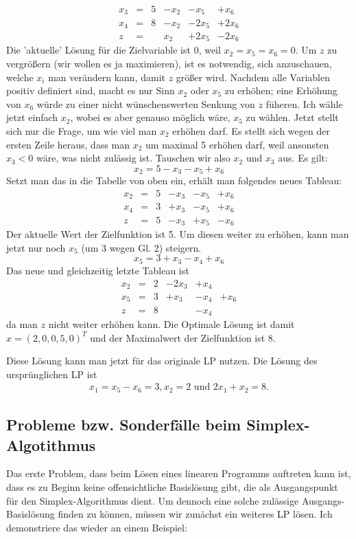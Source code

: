 \documentclass{article}
\begin{document}
\[
\begin{matrix}
    x_3&=&5&-x_2&-x_5&+x_6\\
    x_4&=&8&-x_2&-2x_5&+2x_6\\
    \hline
    z&=&&x_2&+2x_5&-2x_6
\end{matrix}
\]Die 'aktuelle' Lösung für die Zielvariable ist 0, weil \(x_2=x_5=x_6=0\). Um \(z\) zu vergrößern (wir wollen es ja maximieren), ist es notwendig, sich anzuschauen, welche \(x_i\) man verändern kann, damit \(z\) größer wird. Nachdem alle Variablen positiv definiert sind, macht es nur Sinn \(x_2\) oder \(x_5\) zu erhöhen; eine Erhöhung von \(x_6\) würde zu einer nicht wünschenswerten Senkung von \(z\) füheren. Ich wähle jetzt einfach \(x_2\), wobei es aber genauso möglich wäre, \(x_5\) zu wählen. Jetzt stellt sich nur die Frage, um wie viel man \(x_2\) erhöhen darf. Es stellt sich wegen der ersten Zeile heraus, dass man \(x_2\) um maximal 5 erhöhen darf, weil ansonsten \(x_3<0\) wäre, was nicht zulässig ist. Tauschen wir also \(x_2\) und \(x_3\) aus. Es gilt:
\[
x_2 = 5-x_3-x_5+x_6
\]
Setzt man das in die Tabelle von oben ein, erhält man folgendes neues Tableau:
\[
\begin{matrix}
    x_2&=&5&-x_3&-x_5&+x_6\\
    x_4&=&3&+x_3&-x_5&+x_6\\
    \hline
    z&=&5&-x_3&+x_5&-x_6
\end{matrix}
\]Der aktuelle Wert der Zielfunktion ist 5. Um diesen weiter zu erhöhen, kann man jetzt nur noch \(x_5\) (um 3 wegen Gl. 2) steigern.
\[
x_5=3+x_3-x_4+x_6
\]Das neue und gleichzeitig letzte Tableau ist\[
\begin{matrix}
    x_2&=&2&-2x_3&+x_4&\\
    x_5&=&3&+x_3&-x_4&+x_6\\
    \hline
    z&=&8&&-x_4&
\end{matrix}
\]da man \(z\) nicht weiter erhöhen kann. Die Optimale Lösung ist damit \(x=(2,0,0,5,0)^T\) und der Maximalwert der Zielfunktion ist 8.

Diese Lösung kann man jetzt für das originale LP nutzen. Die Lösung des ursprünglichen LP ist\[
\begin{matrix}
    x_1=x_5-x_6=3, x_2=2 \text{ und }2x_1+x_2=8.
\end{matrix}
\]
\subsection{Probleme bzw. Sonderfälle beim Simplex-Algotithmus}
Das erste Problem, dass beim Lösen eines linearen Programms auftreten kann ist, dass es zu Beginn keine offensichtliche Basislösung gibt, die als Ausgangspunkt für den Simplex-Algorithmus dient. Um dennoch eine solche zulässige Ausgangs-Basislösung finden zu können, müssen wir zunächst ein weiteres LP lösen. Ich demonstriere das wieder an einem Beispiel:
\end{document}
